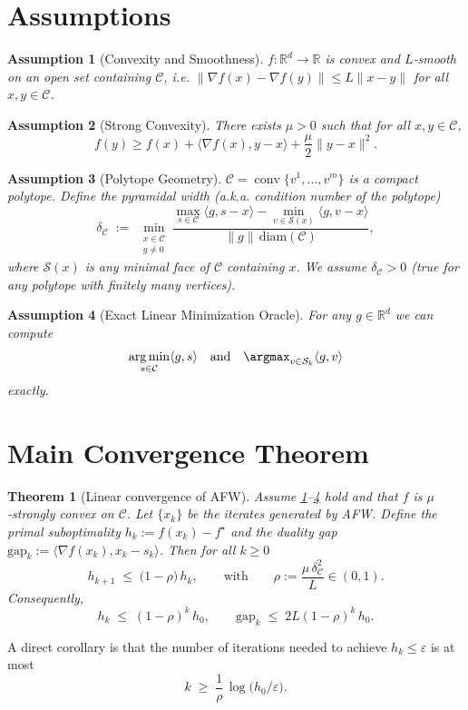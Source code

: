 \documentclass{article}
\newtheorem{theorem}{Theorem}
\newtheorem{assumption}{Assumption}
\newcommand{\R}{\mathbb{R}}
\newcommand{\C}{\mathcal{C}}
\newcommand{\gap}{\mathrm{gap}}
\newcommand{\diam}{\mathrm{diam}}
\newcommand{\conv}{\operatorname{conv}}
\newcommand{\argmin}{\operatorname*{arg\,min}}
\begin{document}
\section*{Assumptions}
\begin{assumption}[Convexity and Smoothness]\label{as:smooth}
$f:\R^{d}\to\R$ is convex and $L$‑smooth on an open set containing $\C$,
i.e. $\|\nabla f(x)-\nabla f(y)\|\le L\|x-y\|$ for all $x,y\in\C$.
\end{assumption}
\begin{assumption}[Strong Convexity]\label{as:strong}
There exists $\mu>0$ such that for all $x,y\in\C$,
\[
f(y)\ge f(x)+\langle\nabla f(x),y-x\rangle+\frac{\mu}{2}\|y-x\|^{2}.
\]
\end{assumption}
\begin{assumption}[Polytope Geometry]\label{as:polytope}
$\C=\conv\{v^{1},\dots ,v^{m}\}$ is a compact polytope.
Define the \emph{pyramidal width} (a.k.a. \emph{condition number of the polytope})
\[
\delta_{\C}\;:=\;\min_{\substack{x\in\C\\
g\neq0}}
\frac{\max_{s\in\C}\langle g,s-x\rangle-\min_{v\in\mathcal{S}(x)}\langle g,v-x\rangle}
{\|g\|\,\diam(\C)},
\]
where $\mathcal{S}(x)$ is any minimal face of $\C$ containing $x$.
We assume $\delta_{\C}>0$ (true for any polytope with finitely many vertices).
\end{assumption}
\begin{assumption}[Exact Linear Minimization Oracle]\label{as:oracle}
For any $g\in\R^{d}$ we can compute
\[
\argmin_{s\in\C}\langle g,s\rangle
\quad\text{and}\quad
\argmax_{v\in\mathcal{S}_{k}}\langle g,v\rangle
\]
exactly.
\end{assumption}

\section*{Main Convergence Theorem}
\begin{theorem}[Linear convergence of AFW]\label{thm:linear}
Assume \ref{as:smooth}–\ref{as:oracle} hold and that $f$ is $\mu$‑strongly convex on $\C$.
Let $\{x_{k}\}$ be the iterates generated by AFW.
Define the primal suboptimality $h_{k}:=f(x_{k})-f^{\star}$ and the duality gap
$\gap_{k}:=\langle \nabla f(x_{k}),x_{k}-s_{k}\rangle$.
Then for all $k\ge0$
\[
h_{k+1}\;\le\;\bigl(1-\rho\bigr)\,h_{k},
\qquad\text{with}\qquad
\rho:=\frac{\mu\,\delta_{\C}^{2}}{L}\in(0,1).
\]
Consequently,
\[
h_{k}\;\le\;(1-\rho)^{k}\,h_{0},\qquad
\gap_{k}\;\le\;2L(1-\rho)^{k}\,h_{0}.
\]
\end{theorem}
A direct corollary is that the number of iterations needed to achieve $h_{k}\le\varepsilon$ is at most
\[
k\;\ge\;\frac{1}{\rho}\,\log\!\bigl(h_{0}/\varepsilon\bigr).
\]
\end{document}
